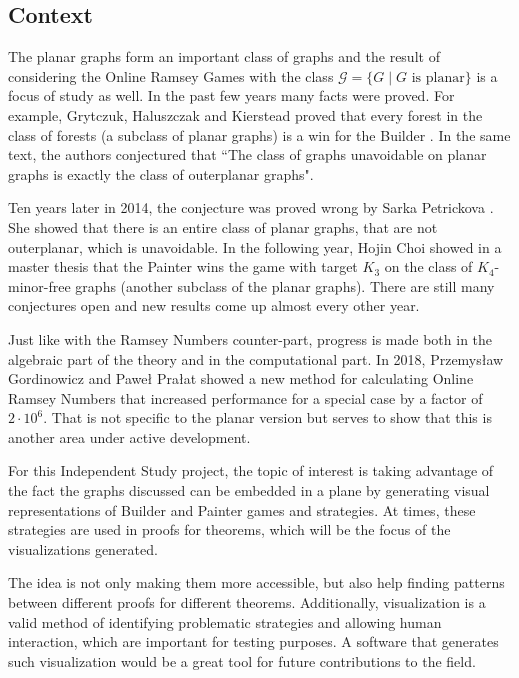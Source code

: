 \subsection*{Context}

The planar graphs form an important class of graphs and the result of considering the Online Ramsey Games with the class $\mathcal{G} = \{G \;|\; G \text{ is planar}\}$ is a focus of study as well. In the past few years many facts were proved. For example, Grytczuk, Haluszczak and Kierstead proved that every forest in the class of forests (a subclass of planar graphs) is a win for the Builder \cite{1}. In the same text, the authors conjectured that ``The class of graphs unavoidable on planar graphs is exactly the class of outerplanar graphs".

Ten years later in 2014, the conjecture was proved wrong by Sarka Petrickova \cite{2}. She showed that there is an entire class of planar graphs, that are not outerplanar, which is unavoidable. In the following year, Hojin Choi showed in a master thesis \cite{3,4} that the Painter wins the game with target $K_3$ on the class of $K_4$-minor-free graphs (another subclass of the planar graphs). There are still many conjectures open and new results come up almost every other year.

Just  like with the Ramsey Numbers counter-part, progress is made both in the algebraic part of the theory and in the computational part. In 2018, Przemysław Gordinowicz and Paweł Prałat\cite{5} showed a new method for calculating Online Ramsey Numbers that increased performance for a special case by a factor of $2\cdot10^6$. That is not specific to the planar version but serves to show that this is another area under active development.

For this Independent Study project, the topic of interest is taking advantage of the fact the graphs discussed can be embedded in a plane by generating visual representations of Builder and Painter games and strategies. At times, these strategies are used in proofs for theorems, which will be the focus of the visualizations generated.

The idea is not only making them more accessible, but also help finding patterns between different proofs for different theorems. Additionally, visualization is a valid method of identifying problematic strategies and allowing human interaction, which are important for testing purposes. A software that generates such visualization would be a great tool for future contributions to the field.